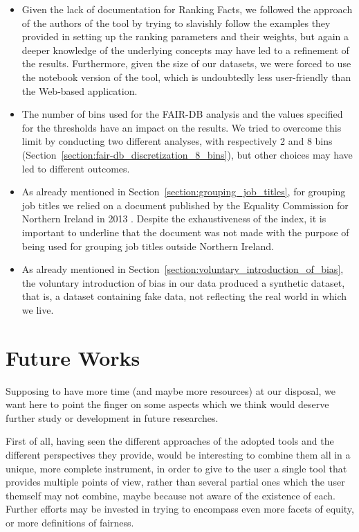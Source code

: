 \begin{itemize}
\item Given the lack of documentation for Ranking Facts, we followed the approach of the authors of the tool by trying to slavishly follow the examples they provided in setting up the ranking parameters and their weights, but again a deeper knowledge of the underlying concepts may have led to a refinement of the results. Furthermore, given the size of our datasets, we were forced to use the notebook version of the tool, which is undoubtedly less user-friendly than the Web-based application.
\item The number of bins used for the FAIR-DB analysis and the values specified for the thresholds have an impact on the results. We tried to overcome this limit by conducting two different analyses, with respectively 2 and 8 bins (Section~\ref{section:fair-db_discretization_8_bins}), but other choices may have led to different outcomes.
\item As already mentioned in Section~\ref{section:grouping_job_titles}, for grouping job titles we relied on a document published by the Equality Commission for Northern Ireland in 2013 \cite{equality2013index}. Despite the exhaustiveness of the index, it is important to underline that the document was not made with the purpose of being used for grouping job titles outside Northern Ireland.
\item As already mentioned in Section~\ref{section:voluntary_introduction_of_bias}, the voluntary introduction of bias in our data produced a synthetic dataset, that is, a dataset containing fake data, not reflecting the real world in which we live.
\end{itemize}


\section{Future Works}
Supposing to have more time (and maybe more resources) at our disposal, we want here to point the finger on some aspects which we think would deserve further study or development in future researches.

First of all, having seen the different approaches of the adopted tools and the different perspectives they provide, would be interesting to combine them all in a unique, more complete instrument, in order to give to the user a single tool that provides multiple points of view, rather than several partial ones which the user themself may not combine, maybe because not aware of the existence of each. Further efforts may be invested in trying to encompass even more facets of equity, or more definitions of fairness.

